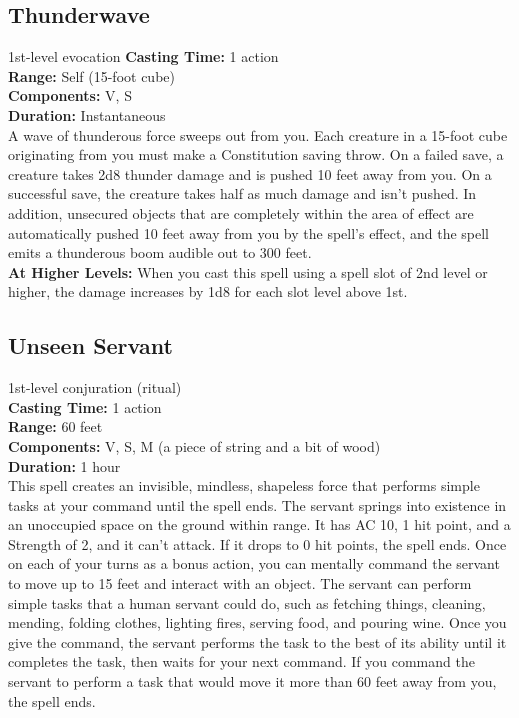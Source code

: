 \documentclass[11pt, A4paper, english]{article}
\begin{document}
		\subsection{Thunderwave}
1st-level evocation
\textbf{Casting Time:} 1 action \\
\textbf{Range:} Self (15-foot cube) \\
\textbf{Components:} V, S \\
\textbf{Duration:} Instantaneous \\
A wave of thunderous force sweeps out from you. Each creature in a 15-foot cube originating from you must make a Constitution saving throw. On a failed save, a creature takes 2d8 thunder damage and is pushed 10 feet away from you. On a successful save, the creature takes half as much damage and isn’t pushed. In addition, unsecured objects that are completely within the area of effect are automatically pushed 10 feet away from you by the spell’s effect, and the spell emits a thunderous boom audible out to 300 feet. \\
\textbf{At Higher Levels:} When you cast this spell using a spell slot of 2nd level or higher, the damage increases by 1d8 for each slot level above 1st.

		\subsection{Unseen Servant}
1st-level conjuration (ritual) \\
\textbf{Casting Time:} 1 action \\
\textbf{Range:} 60 feet \\
\textbf{Components:} V, S, M (a piece of string and a bit of wood) \\
\textbf{Duration:} 1 hour \\
This spell creates an invisible, mindless, shapeless force that performs simple tasks at your command until the spell ends. The servant springs into existence in an unoccupied space on the ground within range. It has AC 10, 1 hit point, and a Strength of 2, and it can’t attack. If it drops to 0 hit points, the spell ends. Once on each of your turns as a bonus action, you can mentally command the servant to move up to 15 feet and interact with an object. The servant can perform simple tasks that a human servant could do, such as fetching things, cleaning, mending, folding clothes, lighting fires, serving food, and pouring wine. Once you give the command, the servant performs the task to the best of its ability until it completes the task, then waits for your next command. If you command the servant to perform a task that would move it more than 60 feet away from you, the spell ends.
\end{document}

